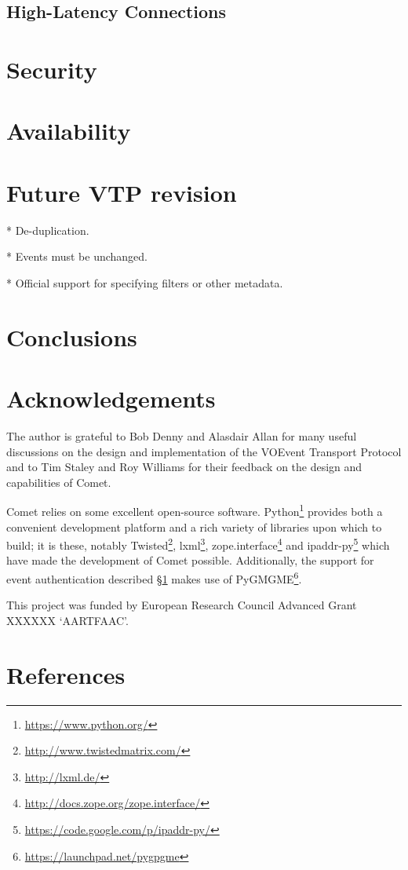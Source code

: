 \documentclass[5p,authoryear]{elsarticle}
\begin{document}
\subsection{High-Latency Connections}
\label{sec:perf:latency}

\section{Security}
\label{sec:security}

\section{Availability}
\label{sec:avail}

\section{Future VTP revision}
\label{sec:futurevtp}

* De-duplication.

* Events must be unchanged.

* Official support for specifying filters or other metadata.

\section{Conclusions}
\label{sec:conclusions}

\section{Acknowledgements}
\label{sec:ack}

The author is grateful to Bob Denny and Alasdair Allan for many useful
discussions on the design and implementation of the VOEvent Transport Protocol
and to Tim Staley and Roy Williams for their feedback on the design and
capabilities of Comet.

Comet relies on some excellent open-source software.
Python\footnote{\url{https://www.python.org/}} provides both a convenient
development platform and a rich variety of libraries upon which to build; it
is these, notably Twisted\footnote{\url{http://www.twistedmatrix.com/}},
lxml\footnote{\url{http://lxml.de/}},
zope.interface\footnote{\url{http://docs.zope.org/zope.interface/}} and
ipaddr-py\footnote{\url{https://code.google.com/p/ipaddr-py/}} which have made
the development of Comet possible. Additionally, the support for event
authentication described \S\ref{sec:security} makes use of
PyGMGME\footnote{\url{https://launchpad.net/pygpgme}}.

This project was funded by European Research Council Advanced Grant XXXXXX
`AARTFAAC'.

\section*{References}



\end{document}
